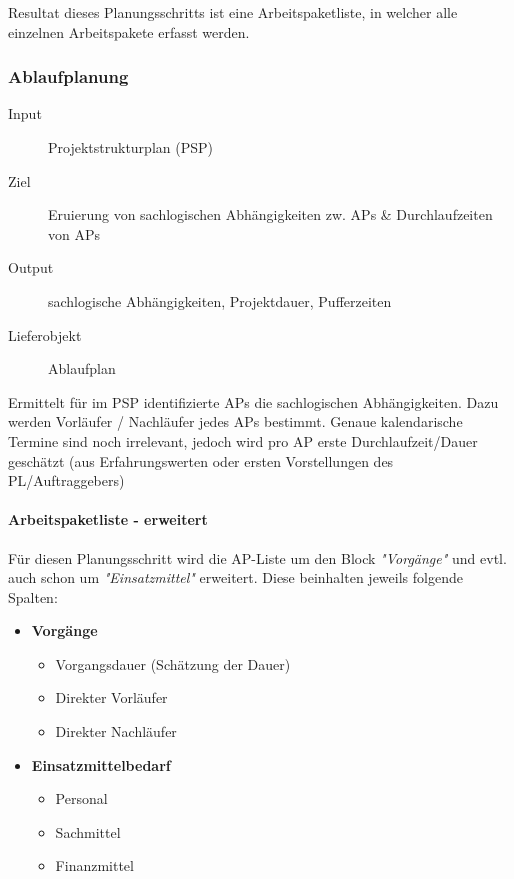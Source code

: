 \documentclass[a4paper]{article}
\begin{document}
			Resultat dieses Planungsschritts ist eine Arbeitspaketliste, in welcher alle einzelnen Arbeitspakete erfasst werden.
			
\newpage
		
		\subsubsection{Ablaufplanung}
		
		\begin{description}
			\item[Input] Projektstrukturplan (PSP)
			\item[Ziel] Eruierung von sachlogischen Abhängigkeiten zw. APs \& Durchlaufzeiten von APs
			\item[Output] sachlogische Abhängigkeiten, Projektdauer, Pufferzeiten
			\item[Lieferobjekt] Ablaufplan
		\end{description}
		\vspace{1em}
		Ermittelt für im PSP identifizierte APs die sachlogischen Abhängigkeiten.
		Dazu werden Vorläufer / Nachläufer jedes APs bestimmt.
		Genaue kalendarische Termine sind noch irrelevant, jedoch wird pro AP erste Durchlaufzeit/Dauer geschätzt (aus Erfahrungswerten oder ersten Vorstellungen des PL/Auftraggebers)
		
			\paragraph{Arbeitspaketliste - erweitert}
			
			Für diesen Planungsschritt wird die AP-Liste um den Block \textit{"Vorgänge"} und evtl. auch schon um \textit{"Einsatzmittel"} erweitert. Diese beinhalten jeweils folgende Spalten:
			
			\begin{itemize}
				\item \textbf{Vorgänge}
					\begin{itemize}
						\item Vorgangsdauer (Schätzung der Dauer)
						\item Direkter Vorläufer
						\item Direkter Nachläufer
					\end{itemize}
				\item \textbf{Einsatzmittelbedarf}
					\begin{itemize}
						\item Personal
						\item Sachmittel
						\item Finanzmittel
					\end{itemize}
			\end{itemize}
			
\end{document}
